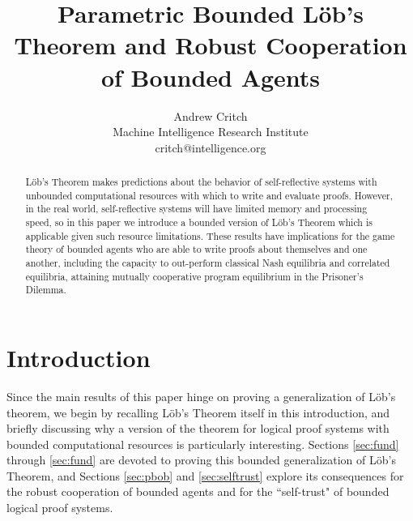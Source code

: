 \documentclass[onecolumn]{miri-tech-article}
\title{Parametric Bounded L\"{o}b's Theorem and Robust Cooperation of Bounded Agents}
\author{Andrew Critch \\ Machine Intelligence Research Institute \\ critch@intelligence.org}
\numberwithin{equation}{section}
\theoremstyle{definition}
\renewcommand{\-}{^{-1}}
\begin{document}
\publishingnote{}

\maketitle

\begin{abstract}
L\"{o}b's Theorem makes predictions about the behavior of self-reflective systems with unbounded computational resources with which to write and evaluate proofs.  However, in the real world, self-reflective systems will have limited memory and processing speed, so in this paper we introduce a bounded version of L\"{o}b's Theorem which is applicable given such resource limitations.  
These results have implications for the game theory of bounded agents who are able to write proofs about themselves and one another, including the capacity to out-perform classical Nash equilibria and correlated equilibria, attaining mutually cooperative program equilibrium in the Prisoner's Dilemma.
\end{abstract}

\section{Introduction}\label{sec:bo}
Since the main results of this paper hinge on proving a generalization of L\"{o}b's theorem, we begin by recalling L\"{o}b's Theorem itself in this introduction, and briefly discussing why a version of the theorem for logical proof systems with bounded computational resources is particularly interesting.   
Sections \ref{sec:fund} through \ref{sec:fund} are devoted to proving this bounded generalization of L\"{o}b's Theorem, and Sections \ref{sec:pbob} and \ref{sec:selftrust} explore its consequences for the robust cooperation of bounded agents and for the ``self-trust" of bounded logical proof systems.
\end{document}
